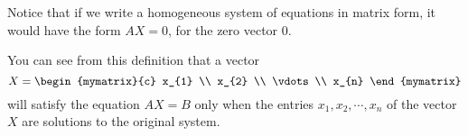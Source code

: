 Notice that if we write a homogeneous system of equations in matrix
form, it would have the form $AX=0$, for the zero vector $0$.

You can see from this definition that a vector 
\begin{equation*}
  X =
  \begin{mymatrix}{c}
    x_{1} \\
    x_{2} \\
    \vdots \\
    x_{n}
  \end{mymatrix}
\end{equation*}
will satisfy the equation $AX=B$ only when the entries
$x_{1}, x_{2}, \cdots, x_{n}$ of the vector $X$ are solutions to the
original system.
